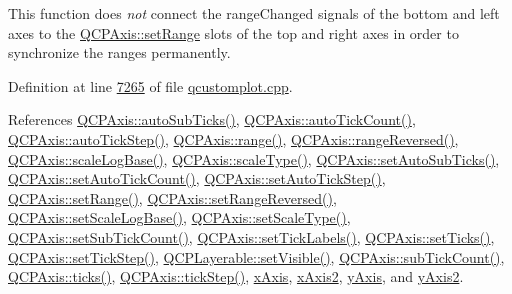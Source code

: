 This function does {\itshape not} connect the range\+Changed signals of the bottom and left axes to the \hyperlink{a00025_a57d6ee9e9009fe88cb19db476ec70bca}{Q\+C\+P\+Axis\+::set\+Range} slots of the top and right axes in order to synchronize the ranges permanently. 

Definition at line \hyperlink{a00115_source_l07265}{7265} of file \hyperlink{a00115_source}{qcustomplot.\+cpp}.



References \hyperlink{a00116_source_l01716}{Q\+C\+P\+Axis\+::auto\+Sub\+Ticks()}, \hyperlink{a00116_source_l01713}{Q\+C\+P\+Axis\+::auto\+Tick\+Count()}, \hyperlink{a00116_source_l01715}{Q\+C\+P\+Axis\+::auto\+Tick\+Step()}, \hyperlink{a00116_source_l01705}{Q\+C\+P\+Axis\+::range()}, \hyperlink{a00116_source_l01706}{Q\+C\+P\+Axis\+::range\+Reversed()}, \hyperlink{a00116_source_l01704}{Q\+C\+P\+Axis\+::scale\+Log\+Base()}, \hyperlink{a00116_source_l01703}{Q\+C\+P\+Axis\+::scale\+Type()}, \hyperlink{a00115_source_l03957}{Q\+C\+P\+Axis\+::set\+Auto\+Sub\+Ticks()}, \hyperlink{a00115_source_l03914}{Q\+C\+P\+Axis\+::set\+Auto\+Tick\+Count()}, \hyperlink{a00115_source_l03946}{Q\+C\+P\+Axis\+::set\+Auto\+Tick\+Step()}, \hyperlink{a00115_source_l03749}{Q\+C\+P\+Axis\+::set\+Range()}, \hyperlink{a00115_source_l03837}{Q\+C\+P\+Axis\+::set\+Range\+Reversed()}, \hyperlink{a00115_source_l03667}{Q\+C\+P\+Axis\+::set\+Scale\+Log\+Base()}, \hyperlink{a00115_source_l03653}{Q\+C\+P\+Axis\+::set\+Scale\+Type()}, \hyperlink{a00115_source_l04210}{Q\+C\+P\+Axis\+::set\+Sub\+Tick\+Count()}, \hyperlink{a00115_source_l03974}{Q\+C\+P\+Axis\+::set\+Tick\+Labels()}, \hyperlink{a00115_source_l03966}{Q\+C\+P\+Axis\+::set\+Ticks()}, \hyperlink{a00115_source_l04151}{Q\+C\+P\+Axis\+::set\+Tick\+Step()}, \hyperlink{a00115_source_l14016}{Q\+C\+P\+Layerable\+::set\+Visible()}, \hyperlink{a00116_source_l01732}{Q\+C\+P\+Axis\+::sub\+Tick\+Count()}, \hyperlink{a00116_source_l01717}{Q\+C\+P\+Axis\+::ticks()}, \hyperlink{a00116_source_l01727}{Q\+C\+P\+Axis\+::tick\+Step()}, \hyperlink{a00116_source_l02076}{x\+Axis}, \hyperlink{a00116_source_l02076}{x\+Axis2}, \hyperlink{a00116_source_l02076}{y\+Axis}, and \hyperlink{a00116_source_l02076}{y\+Axis2}.


